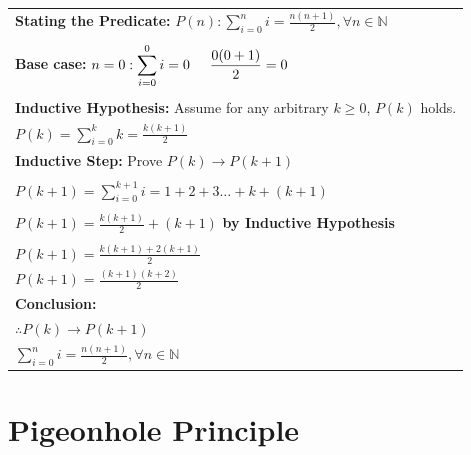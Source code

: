 \documentclass{article}
\begin{document}
\begin{center}
\begin{tabular}{l}
\textbf{Stating the Predicate: }$P(n): \displaystyle\sum_{i = 0}^{n} i = \frac{n(n+1)}{2}, \forall n \in \mathbb N$\\
 \\
\textbf{Base case: } $n = 0: \displaystyle\sum_{i = 0}^0 i = 0 \hspace{0.5cm} \frac{0(0 + 1)}{2} = 0$\\

 \\
\textbf{Inductive Hypothesis: } Assume for any arbitrary $k \geq 0$, $P(k)$ holds.\\

$P(k) = \displaystyle\sum_{i = 0}^{k} k = \frac{k(k+1)}{2}$

 \\

\textbf{Inductive Step: }Prove $P(k) \rightarrow P(k + 1)$\\

\\

$P(k + 1) = \displaystyle\sum_{i = 0}^{k + 1} i = 1 + 2+ 3 \dots + k + (k + 1)$\\

\\

$P(k + 1) = \frac{k(k+1)}{2} + (k + 1)$ \textbf{by Inductive Hypothesis}\\

\\

$P(k + 1) = \frac{k(k+1)+ 2(k+1)}{2}$\\

$P(k + 1) = \frac{(k+1)(k+2)}{2}$\\

\textbf{Conclusion:}\\
$\therefore P(k) \rightarrow P(k+1)$\\
$\displaystyle\sum_{i = 0}^{n} i = \frac{n(n+1)}{2}, \forall n \in \mathbb N$\\
\end{tabular}
\end{center}

\pagebreak

\text{}

\section{Pigeonhole Principle}
\end{document}
